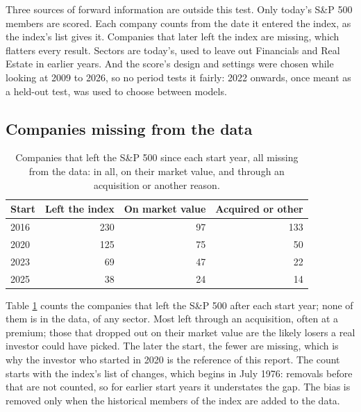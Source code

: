 \documentclass[11pt,a4paper]{article}
\begin{document}
Three sources of forward information are outside this test. Only today's S\&P 500 members are scored. Each company counts from the date it entered the index, as the index's list gives it. Companies that later left the index are missing, which flatters every result. Sectors are today's, used to leave out Financials and Real Estate in earlier years. And the score's design and settings were chosen while looking at 2009 to 2026, so no period tests it fairly: 2022 onwards, once meant as a held-out test, was used to choose between models.

\subsection{Companies missing from the data}
\begin{table}[H]
\centering
\small
\caption{Companies that left the S\&P 500 since each start year, all missing from the data: in all, on their market value, and through an acquisition or another reason.}\label{tab:survivors}
\begin{tabular}{l r r r}
\hline
Start & Left the index & On market value & Acquired or other \\
\hline
2016 & 230 & 97 & 133 \\
2020 & 125 & 75 & 50 \\
2023 & 69 & 47 & 22 \\
2025 & 38 & 24 & 14 \\
\hline
\end{tabular}
\end{table}
Table \ref{tab:survivors} counts the companies that left the S\&P 500 after each start year; none of them is in the data, of any sector. Most left through an acquisition, often at a premium; those that dropped out on their market value are the likely losers a real investor could have picked. The later the start, the fewer are missing, which is why the investor who started in 2020 is the reference of this report. The count starts with the index's list of changes, which begins in July 1976: removals before that are not counted, so for earlier start years it understates the gap. The bias is removed only when the historical members of the index are added to the data.
\end{document}
